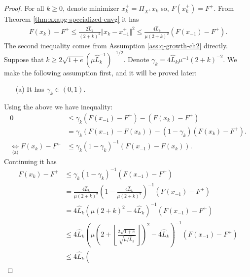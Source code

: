 \documentclass[12pt]{report}
\begin{document}
        \begin{proof}
            For all $k \ge 0$, denote minimizer $x^+_k = \Pi_{X^+}x_k$ so, $F(x^+_k) = F^+$. 
            From Theorem \ref{thm:xxapg-specialized-cnvg} it has 
            \begin{align*}
                F(x_k) - F^+ \le \frac{2 \widehat L_k}{(2 + k)^2}\Vert x_k - x_{-1}^+\Vert^2 \le \frac{4 \widehat L_k}{\mu(2 + k)^2}(F(x_{-1}) - F^+). 
            \end{align*}
            The second inequality comes from Assumption \ref{ass:q-growth-ch2} directly. 
            Suppose that ${k \ge 2\sqrt{1 + e}\left(\mu\widehat L_k^{-1}\right)^{-1/2}}$. 
            Denote $\gamma_k = 4\widehat L_k \mu^{-1}(2 + k)^{-2}$.
            We make the following assumption first, and it will be proved later:
            \begin{enumerate}
                \item [(a)] It has $\gamma_k \in (0, 1)$. 
            \end{enumerate}
            Using the above we have inequality: 
            \begin{align*}
                0 &\le \gamma_k (F(x_{-1}) - F^+) - (F(x_k) - F^+) 
                \\
                &= \gamma_k (F(x_{-1}) - F(x_k)) - (1 - \gamma_k)(F(x_{k}) - F^+). 
                \\
                \underset{\text{(a)}}{\iff} F(x_k) - F^+
                &\le \gamma_k(1 - \gamma_k)^{-1}(F(x_{-1}) - F(x_k)). 
            \end{align*}
            Continuing it has 
            \begin{align*}
                F(x_k) - F^+ &\le \gamma_k (1 -\gamma_k)^{-1}(F(x_{-1}) - F^+)
                \\
                &= \frac{4\widehat L_k}{\mu(2 + k)^{2}}\left(
                    1 - \frac{4\widehat L_k}{\mu(2 + k)^2}
                \right)^{-1}(F(x_{-1}) - F^+)
                \\
                &= 4\widehat L_k(\mu(2 + k)^2 - 4 \widehat L_k)^{-1}(F(x_{-1}) - F^+)
                \\
                &\le 4\widehat L_k\left(
                    \mu\left(
                        2 + \left\lfloor \frac{2\sqrt{1 + e}}{\sqrt{\mu/\widehat L_k}}\right\rfloor
                    \right)^2 - 4 \widehat L_k
                \right)^{-1}(F(x_{-1}) - F^+)
                \\
                &\le 4\widehat L_k\left(

\end{align*}
\end{proof}
\end{document}
